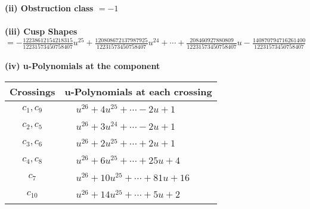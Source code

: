 \documentclass[1p]{elsarticle_modified}
\theoremstyle{definition}
\begin{document}
\flushleft \textbf{(ii) Obstruction class $= -1$}\\~\\
\flushleft \textbf{(iii) Cusp Shapes $= -\frac{12238612154218315}{12231573450758407} u^{25}+\frac{120808672137987925}{12231573450758407} u^{24}+\cdots+\frac{208460927880809}{12231573450758407} u-\frac{140870794716261400}{12231573450758407}$}\\~\\
\newpage\renewcommand{\arraystretch}{1}
\flushleft \textbf{(iv) u-Polynomials at the component}\newline \\
\begin{tabular}{m{50pt}|m{274pt}}
Crossings & \hspace{64pt}u-Polynomials at each crossing \\
\hline $$\begin{aligned}c_{1},c_{9}\end{aligned}$$&$\begin{aligned}
&u^{26}+4 u^{25}+\cdots-2 u+1
\end{aligned}$\\
\hline $$\begin{aligned}c_{2},c_{5}\end{aligned}$$&$\begin{aligned}
&u^{26}+3 u^{24}+\cdots-2 u+1
\end{aligned}$\\
\hline $$\begin{aligned}c_{3},c_{6}\end{aligned}$$&$\begin{aligned}
&u^{26}+2 u^{25}+\cdots+2 u+1
\end{aligned}$\\
\hline $$\begin{aligned}c_{4},c_{8}\end{aligned}$$&$\begin{aligned}
&u^{26}+6 u^{25}+\cdots+25 u+4
\end{aligned}$\\
\hline $$\begin{aligned}c_{7}\end{aligned}$$&$\begin{aligned}
&u^{26}+10 u^{25}+\cdots+81 u+16
\end{aligned}$\\
\hline $$\begin{aligned}c_{10}\end{aligned}$$&$\begin{aligned}
&u^{26}+14 u^{25}+\cdots+5 u+2
\end{aligned}$\\
\hline
\end{tabular}\\~\\
\end{document}
